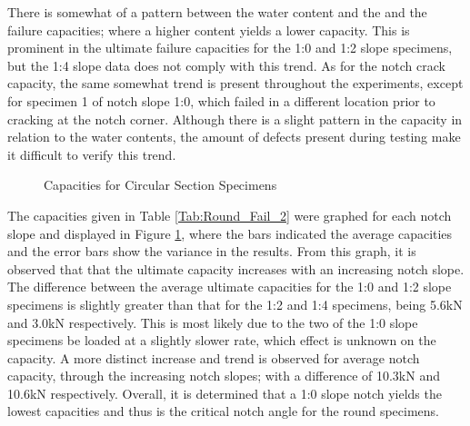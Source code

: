 \documentclass[11pt,a4paper]{article}
\numberwithin{equation}{subsection}
\begin{document}
\vspace*{\baselineskip}
\noindent
There is somewhat of a pattern between the water content and the and the failure capacities; where a higher content yields a lower capacity. This is prominent in the ultimate failure capacities for the 1:0 and 1:2 slope specimens, but the 1:4 slope data does not comply with this trend. As for the notch crack capacity, the same somewhat trend is present throughout the experiments, except for specimen 1 of notch slope 1:0, which failed in a different location prior to cracking at the notch corner. Although there is a slight pattern in the capacity in relation to the water contents, the amount of defects present during testing make it difficult to verify this trend. 

\vspace*{\baselineskip}

\begin{figure}[h]
	\begin{center}
	\end{center}
	\caption{Capacities for Circular Section Specimens}
	\label{fig:Round_Spec_Cap}
\end{figure}

\noindent
The capacities given in Table \ref{Tab:Round_Fail_2} were graphed for each notch slope and displayed in Figure \ref{fig:Round_Spec_Cap}, where the bars indicated the average capacities and the error bars show the variance in the results. From this graph, it is observed that that the ultimate capacity increases with an increasing notch slope. The difference between the average ultimate capacities for the 1:0 and 1:2 slope specimens is slightly greater than that for the 1:2 and 1:4 specimens, being 5.6kN and 3.0kN respectively. This is most likely due to the two of the 1:0 slope specimens be loaded at a slightly slower rate, which effect is unknown on the capacity. A more distinct increase and trend is observed for average notch capacity, through the increasing notch slopes; with a difference of 10.3kN and 10.6kN respectively. Overall, it is determined that a 1:0 slope notch yields the lowest capacities and thus is the critical notch angle for the round specimens.
\end{document}
